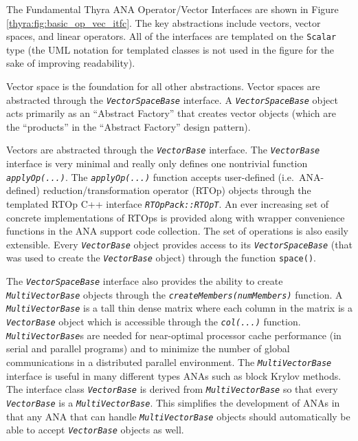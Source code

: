 \documentclass[pdf,ps2pdf,11pt]{SANDreport}
\begin{document}
The Fundamental Thyra ANA Operator/Vector Interfaces are shown in Figure
{}\ref{thyra:fig:basic_op_vec_itfc}.
The key abstractions include vectors, vector spaces, and linear operators.
All of the interfaces are templated on the {}\texttt{Scalar} type (the UML
notation for templated classes is not used in the figure for the sake of
improving readability).

Vector space is the foundation for all other abstractions.  Vector spaces are
abstracted through the {}\texttt{\textit{Vector\-Space\-Base}} interface.  A
{}\texttt{\textit{Vector\-Space\-Base}} object acts primarily as an ``Abstract
Factory'' {}\cite{ref:gama_et_al_1995} that creates vector objects (which are
the ``products'' in the ``Abstract Factory'' design pattern).

Vectors are abstracted through the {}\texttt{\textit{Vector\-Base}} interface.
The {}\texttt{\textit{Vector\-Base}} interface is very minimal and really only
defines one nontrivial function {}\texttt{\textit{applyOp(\-...)}}.  The
{}\texttt{\textit{applyOp(\-...)}} function accepts user-defined
(i.e.~ANA-defined) reduction/transformation operator (RTOp) objects through
the templated RTOp C++ interface {}\texttt{\textit{RTOpPack::RTOpT}}.  An ever
increasing set of concrete implementations of RTOps is provided along with
wrapper convenience functions in the ANA support code collection.  The set of
operations is also easily extensible.  Every {}\texttt{\textit{Vector\-Base}}
object provides access to its {}\texttt{\textit{Vector\-Space\-Base}} (that
was used to create the {}\texttt{\textit{Vector\-Base}} object) through the
function {}\texttt{space()}.

The {}\texttt{\textit{Vector\-Space\-Base}} interface also provides the
ability to create {}\texttt{\textit{Multi\-Vector\-Base}} objects through the
{}\texttt{\textit{createMembers(numMembers)}} function.  A
{}\texttt{\textit{Multi\-Vector\-Base}} is a tall thin dense matrix where each
column in the matrix is a {}\texttt{\textit{Vector\-Base}} object which is
accessible through the {}\texttt{\textit{col(...)}} function.
{}\texttt{\textit{Multi\-Vector\-Base}}s are needed for near-optimal processor
cache performance (in serial and parallel programs) and to minimize the number
of global communications in a distributed parallel environment.  The
{}\texttt{\textit{Multi\-Vector\-Base}} interface is useful in many different
types ANAs such as block Krylov methods.  The interface class
{}\texttt{\textit{Vector\-Base}} is derived from
{}\texttt{\textit{Multi\-Vector\-Base}} so that every
{}\texttt{\textit{Vector\-Base}} is a {}\texttt{\textit{Multi\-Vector\-Base}}.
This simplifies the development of ANAs in that any ANA that can handle
{}\texttt{\textit{Multi\-Vector\-Base}} objects should automatically be able
to accept {}\texttt{\textit{Vector\-Base}} objects as well.
\end{document}
